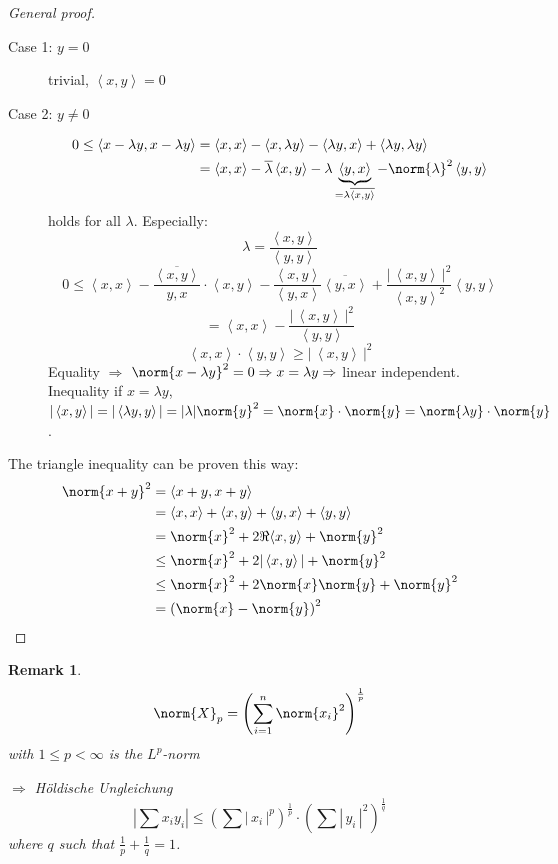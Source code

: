 \documentclass[a4paper,landscape,twocolumn]{article}
\newcommand\abs[1]{|\,#1\,|}
\newcommand\functional[1]{\left\langle{#1}\right\rangle}
\newtheorem{rem}{Remark}
\DeclarePairedDelimiter\norm\lVert\rVert
\begin{document}
\begin{proof}[General proof]
  \begin{description}
    \item[Case 1: $y = 0$] trivial, $\functional{x,y} = 0$
    \item[Case 2: $y \neq 0$]
      \begin{align*}
        0 \leq \functional{x - \lambda y, x - \lambda y}
          &= \functional{x,x} - \functional{x,\lambda y} - \functional{\lambda y, x} + \functional{\lambda y, \lambda y} \\
          &= \functional{x,x} - \overline{\lambda} \functional{x,y} - \lambda \underbrace{\functional{y,x}}_{= \lambda \overline{\functional{x,y}}} - \norm{\lambda}^2 \functional{y,y}
      \end{align*}
      holds for all $\lambda$. Especially:
      \[ \lambda = \frac{\functional{x,y}}{\functional{y,y}} \]
      \[ 0 \leq \functional{x,x} - \frac{\overline{\functional{x,y}}}{y,x} \cdot \functional{x,y} - \frac{\functional{x,y}}{\functional{y,x}} \overline{\functional{y,x}} + \frac{\abs{\functional{x,y}}^2}{\functional{x,y}^2} \functional{y,y} \]
      \[ = \functional{x,x} - \frac{\abs{\functional{x,y}}^2}{\functional{y,y}} \]
      \[ \functional{x,x} \cdot \functional{y,y} \geq \abs{\functional{x,y}}^2 \]
      Equality $\Rightarrow$ $\norm{x - \lambda y}^2 = 0 \Rightarrow x = \lambda y \Rightarrow$ linear independent.
      Inequality if $x = \lambda y$, $|\functional{x,y}| = |\functional{\lambda y,y}| = |\lambda| \norm{y}^2 = \norm{x} \cdot \norm{y} = \norm{\lambda y} \cdot \norm{y}$.
  \end{description}

  The triangle inequality can be proven this way:
  \begin{align*}
    \norm{x + y}^2 &= \functional{x + y, x + y} \\
      &= \functional{x, x} + \functional{x, y} + \functional{y, x} + \functional{y, y} \\
      &= \norm{x}^2 + 2 \Re{\functional{x,y}} + \norm{y}^2 \\
      &\leq \norm{x}^2 + 2 |\functional{x,y}| + \norm{y}^2 \\
      &\leq \norm{x}^2 + 2 \norm{x} \norm{y} + \norm{y}^2 \\
      &= \left(\norm{x} - \norm{y}\right)^2
  \end{align*}
\end{proof}

\begin{rem}
  \[ \norm{X}_p = \left(\sum_{i=1}^n \norm{x_i}^2\right)^{\frac1p} \]
  with $1 \leq p < \infty$ is the $L^p$-norm

  $\Rightarrow$ Höldische Ungleichung
  \[
    |\sum x_i y_i|
      \leq \left(\sum \abs{x_i}^p\right)^{\frac 1p} \cdot \left(\sum \abs{y_i}^2\right)^{\frac 1q}
  \]
  where $q$ such that $\frac 1p + \frac 1q = 1$.
\end{rem}
\end{document}
